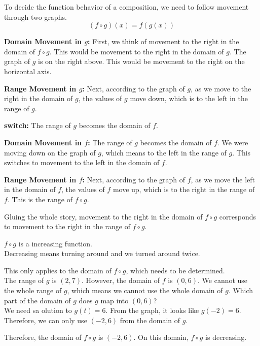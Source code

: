 \documentclass{ximera}
\begin{document}
To decide the function behavior of a composition, we need to follow movement through two graphs. \\



\[
(f \circ g)(x) = f(g(x))
\]



\textbf{\textcolor{blue!55!black}{Domain Movement in $g$:}}  First, we think of movement to the right in the domain of $f \circ g$.  This would be movement to the right in the domain of $g$.  The graph of $g$ is on the right above.  This would be movement to the right on the horizontal axis.



\textbf{\textcolor{blue!55!black}{Range Movement in $g$:}}  Next, according to the graph of $g$, as we move to the right in the domain of $g$, the values of $g$ move down, which is to the left in the range of $g$.




\textbf{\textcolor{blue!55!black}{switch:}}   The range of $g$ becomes the domain of $f$.  


\textbf{\textcolor{blue!55!black}{Domain Movement in $f$:}}   The range of $g$ becomes the domain of $f$.  We were moving down on the graph of $g$, which means to the left in the range of $g$.  This switches to movement to the left in the domain of $f$.


\textbf{\textcolor{blue!55!black}{Range Movement in $f$:}}  Next, according to the graph of $f$, as we move the left in the domain of $f$, the values of $f$ move up, which is to the right in the range of $f$.  This is the range of $f \circ g$.




Gluing the whole story, movement to the right in the domain of $f \circ g$ corresponds to movement to the right in the range of $f \circ g$.

$f \circ g$ is a increasing function. \\


Decreasing means turning around and we turned around twice. \\


\begin{observation}


This only applies to the domain of $f \circ g$, which needs to be determined. \\



The range of $g$ is $(2, 7)$.  However, the domain of $f$ is $(0, 6)$.   We cannot use the whole range of $g$, which means we cannot use the whole domain of $g$.  Which part of the domain of $g$ does $g$ map into $(0, 6)$? \\


We need sa olution to $g(t) = 6$.  From the graph, it looks like $g(-2) = 6$.  Therefore, we can only use $(-2, 6)$ from the domain of $g$.


Therefore, the domain of $f \circ g$ is $(-2, 6)$.  On this domain, $f \circ g$ is decreasing.



\end{observation}
\end{document}
